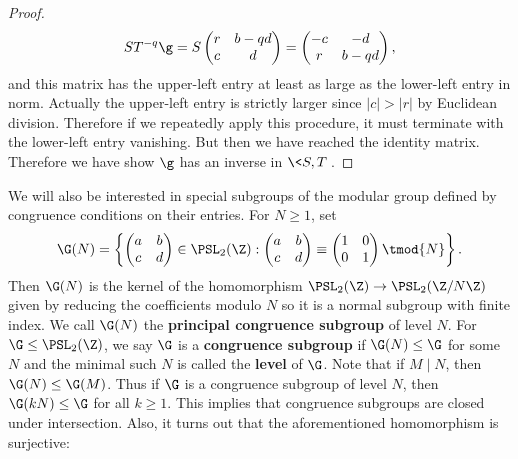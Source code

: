 \begin{proof}
        \[
          ST^{-q}\g = S\begin{pmatrix} r & b-qd \\ c & d \end{pmatrix} = \begin{pmatrix} -c & -d \\ r & b-qd \end{pmatrix},
        \]
        and this matrix has the upper-left entry at least as large as the lower-left entry in norm. Actually the upper-left entry is strictly larger since $|c| > |r|$ by Euclidean division. Therefore if we repeatedly apply this procedure, it must terminate with the lower-left entry vanishing. But then we have reached the identity matrix. Therefore we have show $\g$ has an inverse in $\<S,T\>$.
      \end{proof}

      We will also be interested in special subgroups of the modular group defined by congruence conditions on their entries. For $N \ge 1$, set
      \[
        \G(N) = \left\{\begin{pmatrix} a & b \\ c & d \end{pmatrix} \in \PSL_{2}(\Z):\begin{pmatrix} a & b \\ c & d \end{pmatrix} \equiv \begin{pmatrix} 1 & 0 \\ 0 & 1 \end{pmatrix} \tmod{N}\right\}.
      \]
      Then $\G(N)$ is the kernel of the homomorphism $\PSL_{2}(\Z) \to \PSL_{2}(\Z/N\Z)$ given by reducing the coefficients modulo $N$ so it is a normal subgroup with finite index. We call $\G(N)$ the \textbf{principal congruence subgroup} of level $N$. For $\G \le \PSL_{2}(\Z)$, we say $\G$ is a \textbf{congruence subgroup} if $\G(N) \le \G$ for some $N$ and the minimal such $N$ is called the \textbf{level} of $\G$. Note that if $M \mid N$, then $\G(N) \le \G(M)$. Thus if $\G$ is a congruence subgroup of level $N$, then $\G(kN) \le \G$ for all $k \ge 1$. This implies that congruence subgroups are closed under intersection. Also, it turns out that the aforementioned homomorphism is surjective:

